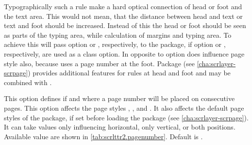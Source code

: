 Typographically such a rule make a hard optical
connection of head or foot and the text area. This would not mean, that the
distance between head and text or text and foot should be increased. Instead
of this the head or foot should be seen as parts of the typing area, while
calculation of margins and typing area. To achieve this \KOMAScript{} will
pass option
 or , respectively, to the
 package, if option  or
, respectively, are used as a class
option. In opposite to 
option  does influence page style  also,
because  uses a page number at the foot. Package
%
 (see \autoref{cha:scrlayer-scrpage})
provides additional features for rules at head and foot and may be combined
with .%
%
\EndIndexGroup


\begin{Declaration}
\end{Declaration}
This option defines if and where a page number will be placed on consecutive
pages. This option affects the page
styles , , and
. It also affects the default page styles of the
 package, if
set before loading the package (see \autoref{cha:scrlayer-scrpage}). It can
take values only influencing horizontal, only vertical, or both
positions. Available value are shown in
\autoref{tab:scrlttr2.pagenumber}. Default is .

